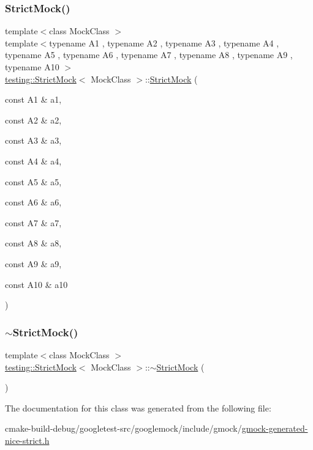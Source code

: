 \subsubsection{\texorpdfstring{StrictMock()}{StrictMock()}\hspace{0.1cm}{\footnotesize\ttfamily [11/11]}}
{\footnotesize\ttfamily template$<$class Mock\+Class $>$ \\
template$<$typename A1 , typename A2 , typename A3 , typename A4 , typename A5 , typename A6 , typename A7 , typename A8 , typename A9 , typename A10 $>$ \\
\mbox{\hyperlink{classtesting_1_1StrictMock}{testing\+::\+Strict\+Mock}}$<$ Mock\+Class $>$\+::\mbox{\hyperlink{classtesting_1_1StrictMock}{Strict\+Mock}} (\begin{DoxyParamCaption}\item[{const A1 \&}]{a1,  }\item[{const A2 \&}]{a2,  }\item[{const A3 \&}]{a3,  }\item[{const A4 \&}]{a4,  }\item[{const A5 \&}]{a5,  }\item[{const A6 \&}]{a6,  }\item[{const A7 \&}]{a7,  }\item[{const A8 \&}]{a8,  }\item[{const A9 \&}]{a9,  }\item[{const A10 \&}]{a10 }\end{DoxyParamCaption})\hspace{0.3cm}{\ttfamily [inline]}}

\mbox{\label{classtesting_1_1StrictMock_a1c7ec10ea86747bb23037380a7353bd1}} 
\subsubsection{\texorpdfstring{$\sim$StrictMock()}{~StrictMock()}}
{\footnotesize\ttfamily template$<$class Mock\+Class $>$ \\
\mbox{\hyperlink{classtesting_1_1StrictMock}{testing\+::\+Strict\+Mock}}$<$ Mock\+Class $>$\+::$\sim$\mbox{\hyperlink{classtesting_1_1StrictMock}{Strict\+Mock}} (\begin{DoxyParamCaption}{ }\end{DoxyParamCaption})\hspace{0.3cm}{\ttfamily [inline]}}



The documentation for this class was generated from the following file\+:\begin{DoxyCompactItemize}
\item 
cmake-\/build-\/debug/googletest-\/src/googlemock/include/gmock/\mbox{\hyperlink{gmock-generated-nice-strict_8h}{gmock-\/generated-\/nice-\/strict.\+h}}\end{DoxyCompactItemize}
